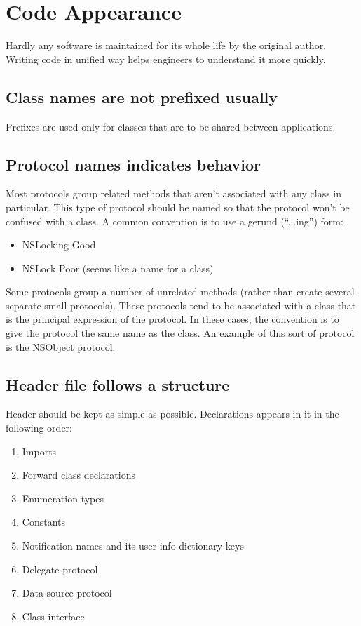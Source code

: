 \documentclass[10pt]{extarticle}
\begin{document}
\tableofcontents

\section{Code Appearance}


Hardly any software is maintained for its whole life by the original author. Writing code in unified way helps engineers to understand it more quickly.


\subsection{Class names are not prefixed usually}

Prefixes are used only for classes that are to be shared between applications.


\subsection{Protocol names indicates behavior}
Most protocols group related methods that aren’t associated with any class in particular. This type of protocol should be named so that the protocol won’t be confused with a class. A common convention is to use a gerund (“...ing”) form:

\begin{itemize}
\item NSLocking	\tabto{3cm} Good
\item NSLock \tabto{3cm} Poor (seems like a name for a class)
\end{itemize}

Some protocols group a number of unrelated methods (rather than create several separate small protocols). These protocols tend to be associated with a class that is the principal expression of the protocol. In these cases, the convention is to give the protocol the same name as the class. An example of this sort of protocol is the NSObject protocol.


\subsection{Header file follows a structure}

Header should be kept as simple as possible. Declarations appears in it in the following order:

\begin{enumerate}
\item Imports
\item Forward class declarations
\item Enumeration types
\item Constants
\item Notification names and its user info dictionary keys
\item Delegate protocol
\item Data source protocol
\item Class interface
\end{enumerate}
\end{document}
